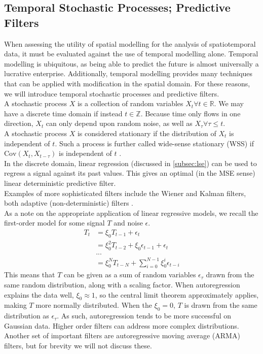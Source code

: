 \documentclass[12pt,a4paper]{article} %
\begin{document}
\subsection{Temporal Stochastic Processes; Predictive Filters}
\label{subsec:temporal_processes}
When assessing the utility of spatial modelling for the analysis of spatiotemporal data, it must be evaluated against the use of temporal modelling alone. Temporal modelling is ubiquitous, as being able to predict the future is almost universally a lucrative enterprise. Additionally, temporal modelling provides many techniques that can be applied with modification in the spatial domain. For these reasons, we will introduce temporal stochastic processes and predictive filters.\\

A stochastic process $X$ is a collection of random variables $X_t\forall t\in\mathbb{R}$. We may have a discrete time domain if instead $t\in\mathbb{Z}$. Because time only flows in one direction, $X_t$ can only depend upon random noise, as well as $X_\tau\forall\tau\leq t$.\\

A stochastic process $X$ is considered stationary if the distribution of $X_t$ is independent of $t$. Such a process is further called wide-sense stationary (WSS) if $\text{Cov}(X_t,X_{t-\tau})$ is independent of $t$ \cite{stochastic_wiki}.\\

In the discrete domain, linear regression (discussed in \ref{subsec:lse}) can be used to regress a signal against its past values. This gives an optimal (in the MSE sense) linear deterministic predictive filter.\\

Examples of more sophisticated filters include the Wiener and Kalman filters, both adaptive (non-deterministic) filters \cite{wiener}.\\

As a note on the appropriate application of linear regressive models, we recall the first-order model for some signal $T$ and noise $\epsilon$.
\begin{align*}
    T_{t}&=\xi_0T_{t-1}+\epsilon_t\\
    &=\xi_0^2T_{t-2}+\xi_0\epsilon_{t-1}+\epsilon_t\\
    &...\\
    &=\xi^N_0T_{t-N}+\sum_{i=0}^{N-1}\xi_0^i\epsilon_{t-i}
\end{align*}
This means that $T$ can be given as a sum of random variables $\epsilon_\tau$ drawn from the same random distribution, along with a scaling factor. When autoregression explains the data well, $\xi_0\approx1$, so the central limit theorem approximately applies, making $T$ more normally distributed. When the $\xi_0=0$, $T$ is drawn from the same distribution as $\epsilon_\tau$. As such, autoregression tends to be more successful on Gaussian data. Higher order filters can address more complex distributions. Another set of important filters are autoregressive moving average (ARMA) filters, but for brevity we will not discuss these.\\
\end{document}
